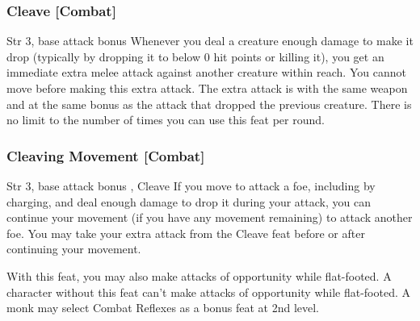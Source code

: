 \subsubsection{Cleave [Combat]}
 Str 3, base attack bonus 
 Whenever you deal a creature enough damage to make it drop (typically by dropping it to below 0 hit points or killing it), you get an immediate extra melee attack against another creature within reach. You cannot move before making this extra attack. The extra attack is with the same weapon and at the same bonus as the attack that dropped the previous creature. There is no limit to the number of times you can use this feat per round.

\subsubsection{Cleaving Movement [Combat]}
 Str 3, base attack bonus , Cleave
 If you move to attack a foe, including by charging, and deal enough damage to drop it during your attack, you can continue your movement (if you have any movement remaining) to attack another foe. You may take your extra attack from the Cleave feat before or after continuing your movement.



With this feat, you may also make attacks of opportunity while flat-footed.
 A character without this feat can't make attacks of opportunity while flat-footed.
 A monk may select Combat Reflexes as a bonus feat at 2nd level.


